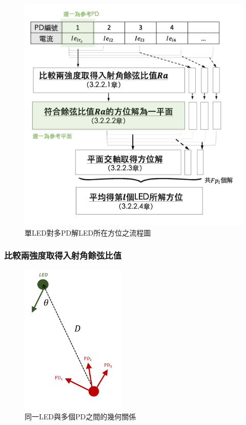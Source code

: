     \begin{figure}[htpb]
        \centering
        \includegraphics[width=12cm]{ch3pic/orient_flow_1led.png}
        \caption{單LED對多PD解LED所在方位之流程圖}
        \label{pic:orient_flow_1led}
    \end{figure}

    

    \subsubsection{比較兩強度取得入射角餘弦比值}
    \label{chp:cosine_ratio}

        \begin{figure}[htpb]
            \centering
            \includegraphics[width=5cm]{ch3pic/1led_mulpd.png}
            \caption{同一LED與多個PD之間的幾何關係}
            \label{pic:1led_mulpd}
        \end{figure}

